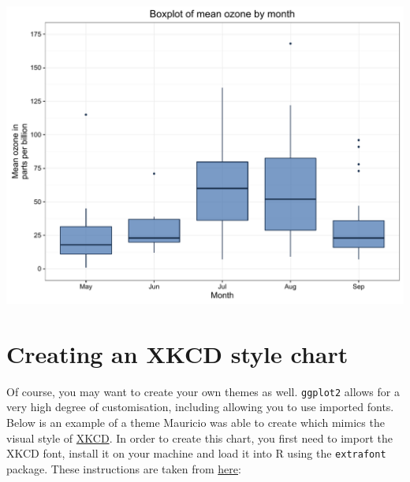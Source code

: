 \begin{Shaded}
\begin{Highlighting}[]
\StringTok{ }\StringTok{ }\NormalTok{()}
\end{Highlighting}
\end{Shaded}

\begin{center}\includegraphics[width=0.55\linewidth]{figures/box_10-1} \end{center}

\section{Creating an XKCD style
chart}\label{creating-an-xkcd-style-chart-9}

Of course, you may want to create your own themes as well.
\texttt{ggplot2} allows for a very high degree of customisation,
including allowing you to use imported fonts. Below is an example of a
theme Mauricio was able to create which mimics the visual style of
\href{http://xkcd.com/}{XKCD}. In order to create this chart, you first
need to import the XKCD font, install it on your machine and load it
into R using the \texttt{extrafont} package. These instructions are
taken from
\href{https://www.google.com.au/url?sa=t\&rct=j\&q=\&esrc=s\&source=web\&cd=1\&ved=0ahUKEwiWzafchdPJAhVBpJQKHe_LDT8QFggbMAA\&url=https\%3A\%2F\%2Fcran.r-project.org\%2Fweb\%2Fpackages\%2Fxkcd\%2Fvignettes\%2Fxkcd-intro.pdf\&usg=AFQjCNE-KciGY14e-Q1buYIVmTFC0ht__Q\&sig2=DZUwkvIHwfNWtTtkcz94jg}{here}:

\begin{Shaded}
\begin{Highlighting}[]

\NormalTok{(}\NormalTok{, }
\StringTok{       }\NormalTok{, }\NormalTok{)}
\NormalTok{(}\NormalTok{)}
\NormalTok{(}\NormalTok{)}
\NormalTok{(} \NormalTok{, }\NormalTok{)}
\NormalTok{()}
\NormalTok{()}
\end{Highlighting}
\end{Shaded}

